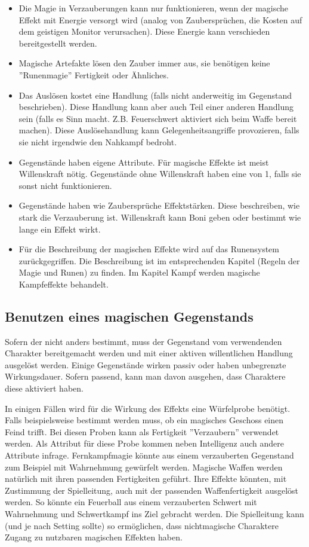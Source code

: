 \documentclass{article}
\begin{document}
\begin{itemize}
\item Die Magie in Verzauberungen kann nur funktionieren, wenn der magische Effekt mit Energie versorgt wird (analog von Zaubersprüchen, die Kosten auf dem geistigen Monitor verursachen). Diese Energie kann verschieden bereitgestellt werden.
\item Magische Artefakte lösen den Zauber immer aus, sie benötigen keine ''Runenmagie'' Fertigkeit oder Ähnliches.
\item Das Auslösen kostet eine Handlung (falls nicht anderweitig im Gegenstand beschrieben). Diese Handlung kann aber auch Teil einer anderen Handlung sein (falls es Sinn macht. Z.B. Feuerschwert aktiviert sich beim Waffe bereit machen). Diese Auslösehandlung kann Gelegenheitsangriffe provozieren, falls sie nicht irgendwie den Nahkampf bedroht.
\item Gegenstände haben eigene Attribute. Für magische Effekte ist meist Willenskraft nötig. Gegenstände ohne Willenskraft haben eine von 1, falls sie sonst nicht funktionieren.
\item Gegenstände haben wie Zaubersprüche Effektstärken. Diese beschreiben, wie stark die Verzauberung ist. Willenskraft kann Boni geben oder bestimmt wie lange ein Effekt wirkt.
\item Für die Beschreibung der magischen Effekte wird auf das Runensystem zurückgegriffen. Die Beschreibung ist im entsprechenden Kapitel (Regeln der Magie und Runen) zu finden. Im Kapitel Kampf werden magische Kampfeffekte behandelt.
\end{itemize}

\begin{center}
\subsection{Benutzen eines magischen Gegenstands}
\end{center}

Sofern der nicht anders bestimmt, muss der Gegenstand vom verwendenden Charakter bereitgemacht werden und mit einer
aktiven willentlichen Handlung ausgelöst werden. Einige Gegenstände wirken passiv oder haben unbegrenzte Wirkungsdauer.
Sofern passend, kann man davon ausgehen, dass Charaktere diese aktiviert haben.

In einigen Fällen wird für die Wirkung des Effekts eine Würfelprobe benötigt. Falls beispielsweise bestimmt werden muss,
ob ein magisches Geschoss einen Feind trifft. Bei diesen Proben kann als Fertigkeit ''Verzaubern'' verwendet werden. Als
Attribut für diese Probe kommen neben Intelligenz auch andere Attribute infrage. Fernkampfmagie könnte aus einem
verzauberten Gegenstand zum Beispiel mit Wahrnehmung gewürfelt werden.
Magische Waffen werden natürlich mit ihren passenden Fertigkeiten geführt. Ihre Effekte könnten, mit Zustimmung der
Spielleitung, auch mit der passenden Waffenfertigkeit ausgelöst werden. So könnte ein Feuerball aus einem verzauberten
Schwert mit Wahrnehmung und Schwertkampf ins Ziel gebracht werden. Die Spielleitung kann (und je nach Setting sollte) so
ermöglichen, dass nichtmagische Charaktere Zugang zu nutzbaren magischen Effekten haben.
\end{document}
